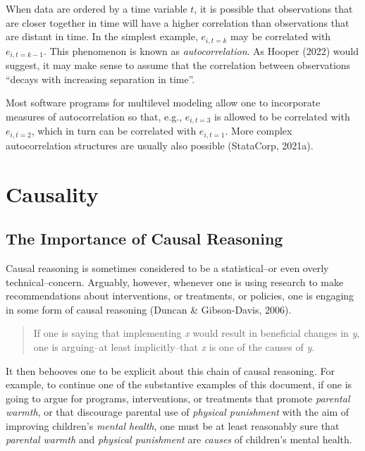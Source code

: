 \documentclass[
  letterpaper,
  DIV=11,
  numbers=noendperiod]{scrreprt}
\begin{document}
When data are ordered by a time variable \(t\), it is possible that
observations that are closer together in time will have a higher
correlation than observations that are distant in time. In the simplest
example, \(e_{i, t=k}\) may be correlated with \(e_{i, t=k-1}\). This
phenomenon is known as \emph{autocorrelation}. As Hooper (2022) would
suggest, it may make sense to assume that the correlation between
observations ``decays with increasing separation in time''.

Most software programs for multilevel modeling allow one to incorporate
measures of autocorrelation so that, e.g., \(e_{i,t=3}\) is allowed to
be correlated with \(e_{i,t=2}\), which in turn can be correlated with
\(e_{i,t=1}\). More complex autocorrelation structures are usually also
possible (StataCorp, 2021a).

\hypertarget{causality}{%
\section{Causality}\label{causality}}

\hypertarget{the-importance-of-causal-reasoning}{%
\subsection{The Importance of Causal
Reasoning}\label{the-importance-of-causal-reasoning}}

Causal reasoning is sometimes considered to be a statistical--or even
overly technical--concern. Arguably, however, whenever one is using
research to make recommendations about interventions, or treatments, or
policies, one is engaging in some form of causal reasoning (Duncan \&
Gibson-Davis, 2006).

\begin{quote}
If one is saying that implementing \emph{x} would result in beneficial
changes in \emph{y}, one is arguing--at least implicitly--that \emph{x}
is one of the causes of \emph{y}.
\end{quote}

It then behooves one to be explicit about this chain of causal
reasoning. For example, to continue one of the substantive examples of
this document, if one is going to argue for programs, interventions, or
treatments that promote \emph{parental warmth}, or that discourage
parental use of \emph{physical punishment} with the aim of improving
children's \emph{mental health}, one must be at least reasonably sure
that \emph{parental warmth} and \emph{physical punishment} are
\emph{causes} of children's mental health.
\end{document}
